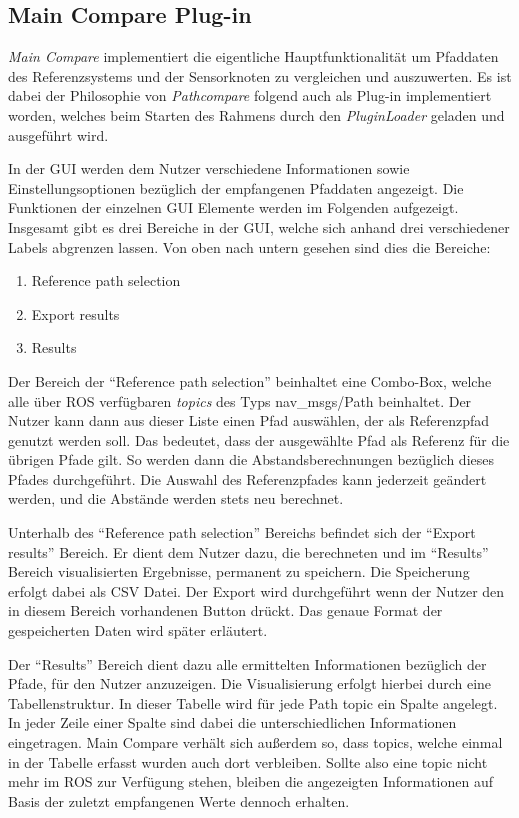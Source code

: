 \subsection{Main Compare Plug-in}
\label{sub:maincompare}


\textit{Main Compare} implementiert die eigentliche Hauptfunktionalität um Pfaddaten des
Referenzsystems und der Sensorknoten zu vergleichen und auszuwerten. 
Es ist dabei der Philosophie von \textit{Pathcompare} folgend auch als Plug-in
implementiert worden, welches beim Starten des Rahmens durch den
\textit{PluginLoader} geladen und ausgeführt wird.

In der GUI werden dem Nutzer verschiedene Informationen sowie
Einstellungsoptionen bezüglich der
empfangenen Pfaddaten angezeigt. Die Funktionen der einzelnen GUI Elemente
werden im Folgenden aufgezeigt.
Insgesamt gibt es drei Bereiche in der GUI, welche sich anhand drei
verschiedener Labels abgrenzen lassen. Von oben nach untern gesehen sind
dies die Bereiche:

\begin{enumerate}
  \item Reference path selection
  \item Export results
  \item Results
\end{enumerate}


Der Bereich der ``Reference path selection'' beinhaltet eine Combo-Box, welche
alle über ROS verfügbaren \textit{topics} des Typs nav\_msgs/Path beinhaltet.
Der Nutzer kann dann aus dieser Liste einen Pfad auswählen, der als
Referenzpfad genutzt werden soll. Das bedeutet, dass der ausgewählte Pfad als
Referenz für die übrigen Pfade gilt. So werden dann die Abstandsberechnungen
bezüglich dieses Pfades durchgeführt. Die Auswahl des Referenzpfades kann
jederzeit geändert werden, und die Abstände werden stets neu berechnet.

Unterhalb des ``Reference path selection'' Bereichs befindet sich der ``Export
results'' Bereich. Er dient dem Nutzer dazu, die berechneten und
im ``Results'' Bereich visualisierten Ergebnisse, permanent zu speichern.
Die Speicherung erfolgt dabei als \gls{CSV} Datei. Der Export wird durchgeführt
wenn der Nutzer den in diesem Bereich vorhandenen Button drückt. 
Das genaue Format der gespeicherten Daten wird später erläutert.

Der ``Results'' Bereich dient dazu alle ermittelten Informationen bezüglich der
Pfade, für den Nutzer anzuzeigen. Die Visualisierung erfolgt hierbei durch eine
Tabellenstruktur. In dieser Tabelle wird für jede Path topic ein Spalte
angelegt.
In jeder Zeile einer Spalte sind dabei die unterschiedlichen
Informationen eingetragen.
Main Compare verhält sich außerdem so, dass topics, welche einmal in
der Tabelle erfasst wurden auch dort verbleiben. Sollte also eine topic nicht
mehr im ROS zur Verfügung stehen, bleiben die angezeigten Informationen auf
Basis der zuletzt empfangenen Werte dennoch erhalten. 

